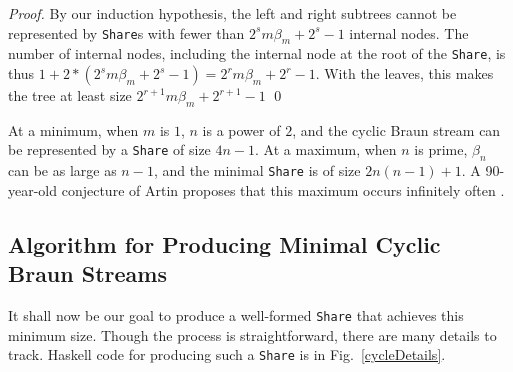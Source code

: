 \documentclass[envcountsect]{llncs}
\newcommand{\share}{{\tt Share} }
\begin{document}
\begin{proof}
By our induction hypothesis, the left and right subtrees cannot be represented by {\tt Share}s with fewer than $2^s m \beta_m + 2^s - 1$ internal nodes.
The number of internal nodes, including the internal node at the root of the {\tt Share}, is thus $1+2*(2^s m \beta_m + 2^s - 1) = 2^r m \beta_m + 2^r - 1$.
With the leaves, this makes the tree at least size $2^{r+1} m \beta_m + 2^{r+1} - 1$
\qed
\end{proof}

At a minimum, when $m$ is $1$, $n$ is a power of $2$, and the cyclic Braun stream can be represented by a {\tt Share} of size $4n-1$.
At a maximum, when $n$ is prime, $\beta_n$ can be as large as $n-1$, and the minimal {\tt Share} is of size $2n(n-1)+1$.
A 90-year-old conjecture of Artin proposes that this maximum occurs infinitely often \cite{artin}.

\subsection{Algorithm for Producing Minimal Cyclic Braun Streams}
\label{cycleAlgo}

It shall now be our goal to produce a well-formed \share that achieves this minimum size.
Though the process is straightforward, there are many details to track.
Haskell code for producing such a \share is in Fig.~\ref{cycleDetails}.
\end{document}
